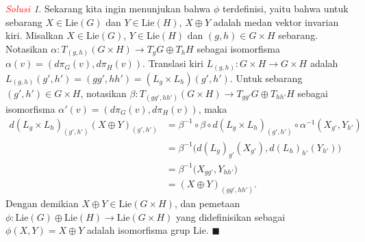 \documentclass[11pt]{article}
\theoremstyle{definition}
\theoremstyle{remark}
\newtheorem*{solution}{\textcolor{red}{Solusi}}
\newcommand{\Lie}{\text{Lie}}               %
\newcommand{\LieG}{\text{Lie}(G)}           %
\newcommand{\LieH}{\text{Lie}(H)}               %
\begin{document}
\begin{solution}
Sekarang kita ingin menunjukan bahwa $\phi$ terdefinisi, yaitu bahwa untuk sebarang $X \in \LieG$ dan $Y \in \LieH$, $X \oplus Y$ adalah medan vektor  invarian kiri. Misalkan $X \in \LieG$, $Y \in \LieH$ dan $(g,h) \in G \times H$ sebarang. Notasikan $\alpha : T_{(g,h)}(G \times H) \to T_gG \oplus T_hH$ sebagai isomorfisma $\alpha(v) = (d\pi_G(v), d\pi_H(v))$. Translasi kiri $L_{(g,h)} : G \times H \to G \times H$ adalah $L_{(g,h)} (g',h') = (gg',hh') = (L_g\times L_h) (g',h')$. Untuk sebarang $(g',h') \in G \times H$, notasikan $\beta : T_{(gg',hh')}(G \times H) \to T_{gg'}G \oplus T_{hh'}H$ sebagai isomorfisma $\alpha'(v) = (d\pi_G(v),d\pi_H(v))$, maka
\begin{align*}
d(L_g\times L_h)_{(g',h')} (X \oplus Y)_{(g',h')} &= \beta^{-1} \circ \beta \circ d(L_g\times L_h)_{(g',h')} \circ \alpha^{-1}(X_{g'},Y_{h'}) \\
&=\beta^{-1}\Big(d(L_g)_{g'}(X_{g'}), d(L_h)_{h'}(Y_{h'}) \Big) \\
&= \beta^{-1}\big( X_{gg'}, Y_{hh'} \big) \\
&= (X \oplus Y)_{(gg',hh')}.
\end{align*}
Dengan demikian $X \oplus Y \in \Lie(G \times H)$, dan pemetaan $\phi : \Lie(G) \oplus \Lie(H) \to \Lie(G \times H)$ yang didefinisikan sebagai $\phi (X,Y) = X \oplus Y$ adalah isomorfisma grup Lie. $\blacksquare$
\end{solution}
\end{document}
